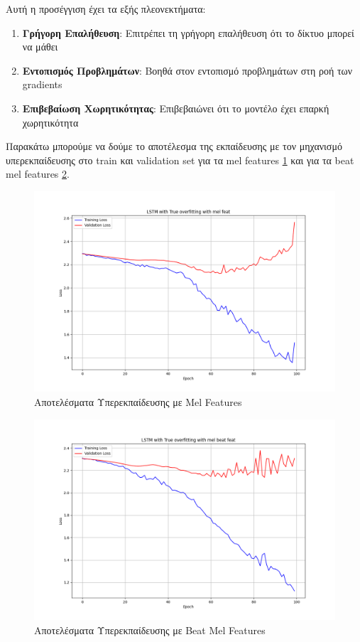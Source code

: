 \documentclass[a4paper,12pt]{article}
\begin{document}
Αυτή η προσέγγιση έχει τα εξής πλεονεκτήματα:

\begin{enumerate}
    \item \textbf{Γρήγορη Επαλήθευση}: Επιτρέπει τη γρήγορη επαλήθευση ότι το δίκτυο μπορεί να μάθει
    \item \textbf{Εντοπισμός Προβλημάτων}: Βοηθά στον εντοπισμό προβλημάτων στη ροή των gradients
    \item \textbf{Επιβεβαίωση Χωρητικότητας}: Επιβεβαιώνει ότι το μοντέλο έχει επαρκή χωρητικότητα
\end{enumerate}

Παρακάτω μπορούμε να δούμε το αποτέλεσμα της εκπαίδευσης με τον μηχανισμό υπερεκπαίδευσης
στο train και validation set για τα mel features \ref{fig:overfit_mel} και για τα beat mel features \ref{fig:overfit_beat}.

\begin{figure}[h!]
    \centering
    \includegraphics[width=\textwidth]{images/LSTM with True overfitting with mel feat.png}
    \caption{Αποτελέσματα Υπερεκπαίδευσης με Mel Features}
    \label{fig:overfit_mel}
\end{figure}

\begin{figure}[h!]
    \centering
    \includegraphics[width=\textwidth]{images/LSTM with True overfitting with mel beat feat.png}
    \caption{Αποτελέσματα Υπερεκπαίδευσης με Beat Mel Features}
    \label{fig:overfit_beat}
\end{figure}
\end{document}
